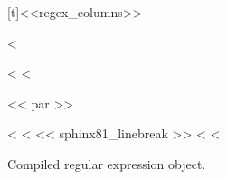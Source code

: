 \documentclass[letterpaper,10pt,english]{sphinxmanual}
\begin{document}
\begin{fulllineitems}
\begin{savenotes}
\begin{tabulary}{\linewidth}[t]{<<regex_columns>>}
\begin{varwidth}[t]{}
<%
\end{varwidth}%
<%
<%
\end{tabulary}
<< par >>
\sphinxattableend\end{savenotes}

\end{fulllineitems}


\begin{fulllineitems}
\label{\detokenize{regex:tests.regex_demo.one_flag}}
<%
\pysigstartsignatures
<%
\pysigline<< sphinx81_linebreak >>{}
<%
\pysigstopsignatures
<%
    

Compiled regular expression object.



\end{fulllineitems}
\end{document}
